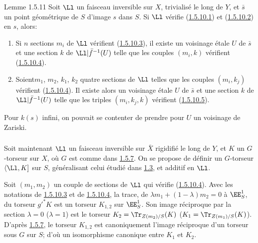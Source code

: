 \begin{enonce*}{Lemme 1.5.11}
Soit $\Ll$ un faisceau inversible sur $X$, trivialisé le long
de $Y$, et $\bar{s}$ un point géométrique de $S$ d'image $s$ dans
$S$. Si $\Ll$ vérifie (\hyperref[XVIII.par1.5.10.1]{1.5.10.1}) et
(\hyperref[XVIII.par1.5.10.2]{1.5.10.2}) en $s$, alors:
\begin{enumerate}
\renewcommand{\theenumi}{\Roman{enumi}}
\renewcommand{\labelenumi}{(\theenumi)}
\item Si $n$ sections $m_{i}$ de $\Ll$ vérifient (\hyperref[XVIII.par1.5.10.3]{1.5.10.3}),
il existe un voisinage étale $U$ de $\bar{s}$ et une section $k$ de
$\Ll|\bar{f}^{-1}(U)$ telle que les couples $(m_{i},k)$ vérifient
(\hyperref[XVIII.par1.5.10.4]{1.5.10.4}).

\item Soient\pageoriginale $m_{1}$, $m_{2}$, $k_{1}$, $k_{2}$ quatre
sections de $\Ll$ telles que les couples $(m_{i},k_{j})$
vérifient (\hyperref[XVIII.par1.5.10.4]{1.5.10.4}). Il existe alors un voisinage étale $U$ de
$\bar{s}$ et une section $k$ de $\Ll|\bar{f}^{-1}(U)$ telle que les
triples $(m_{i}, k_{j}, k)$ vérifient (\hyperref[XVIII.par1.5.10.5]{1.5.10.5}). 
\end{enumerate}
\end{enonce*}

Pour $k(s)$ infini, on pouvait se contenter de prendre pour $U$ un
voisinage de Zariski.

\setcounter{subsubsection}{11}
\subsubsection{}
Soit maintenant $\Ll$ un faisceau inversible sur $\bar{X}$
rigidifié le long de $Y$, et $K$ un $G$-torseur sur $X$, où $G$ est
comme dans \hyperref[XVIII.lem1.5.7]{1.5.7}. On se propose de définir un $G$-torseur
$\langle \Ll,K]$ sur $S$, généralisant celui étudié dans \hyperref[XVIII.subsec1.3]{1.3}, et
additif en $\Ll$.

Soit $(m_{1},m_{2})$ un couple de sections de $\Ll$ qui
vérifie (\hyperref[XVIII.par1.5.10.4]{1.5.10.4}). Avec les notations de
\hyperref[XVIII.par1.5.10.3]{1.5.10.3} et de \hyperref[XVIII.par1.5.10.4]{1.5.10.4}, la
trace, de $\lambda m_{1}+(1-\lambda)m_{2}=0$ à $\EE^{1}_{S}$,
du torseur ${g'}^{\ast}K$ est un torseur $K_{1,2}$ sur
$\EE^{1}_{S}$. Son image réciproque par la section $\lambda =
0$ (\resp $\lambda = 1$) est le torseur $K_{2}=\Tr_{Z(m_{2})/S}(K)$
(\resp $K_{1}=\Tr_{Z(m_{1})/S}(K)$). D'après \hyperref[XVIII.lem1.5.7]{1.5.7}, le torseur
$K_{1,2}$ est canoniquement l'image réciproque d'un torseur sous $G$
sur $S$; d'où un isomorphisme canonique entre $K_{1}$ et $K_{2}$.

